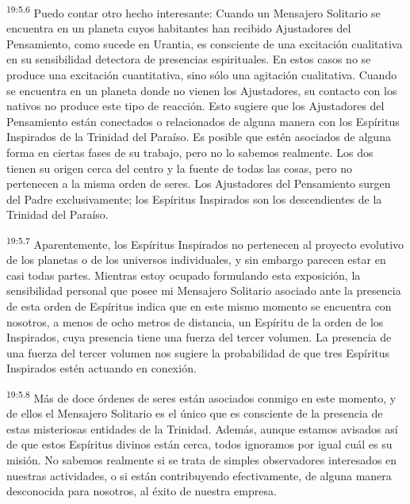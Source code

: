 \par
\textsuperscript{19:5.6} Puedo contar otro hecho interesante: Cuando un Mensajero Solitario se encuentra en un planeta cuyos habitantes han recibido Ajustadores del Pensamiento, como sucede en Urantia, es consciente de una excitación cualitativa en su sensibilidad detectora de presencias espirituales. En estos casos no se produce una excitación cuantitativa, sino sólo una agitación cualitativa. Cuando se encuentra en un planeta donde no vienen los Ajustadores, su contacto con los nativos no produce este tipo de reacción. Esto sugiere que los Ajustadores del Pensamiento están conectados o relacionados de alguna manera con los Espíritus Inspirados de la Trinidad del Paraíso. Es posible que estén asociados de alguna forma en ciertas fases de su trabajo, pero no lo sabemos realmente. Los dos tienen su origen cerca del centro y la fuente de todas las cosas, pero no pertenecen a la misma orden de seres. Los Ajustadores del Pensamiento surgen del Padre exclusivamente; los Espíritus Inspirados son los descendientes de la Trinidad del Paraíso.

\par
\textsuperscript{19:5.7} Aparentemente, los Espíritus Inspirados no pertenecen al proyecto evolutivo de los planetas o de los universos individuales, y sin embargo parecen estar en casi todas partes. Mientras estoy ocupado formulando esta exposición, la sensibilidad personal que posee mi Mensajero Solitario asociado ante la presencia de esta orden de Espíritus indica que en este mismo momento se encuentra con nosotros, a menos de ocho metros de distancia, un Espíritu de la orden de los Inspirados, cuya presencia tiene una fuerza del tercer volumen. La presencia de una fuerza del tercer volumen nos sugiere la probabilidad de que tres Espíritus Inspirados estén actuando en conexión.

\par
\textsuperscript{19:5.8} Más de doce órdenes de seres están asociados conmigo en este momento, y de ellos el Mensajero Solitario es el único que es consciente de la presencia de estas misteriosas entidades de la Trinidad. Además, aunque estamos avisados así de que estos Espíritus divinos están cerca, todos ignoramos por igual cuál es su misión. No sabemos realmente si se trata de simples observadores interesados en nuestras actividades, o si están contribuyendo efectivamente, de alguna manera desconocida para nosotros, al éxito de nuestra empresa.

